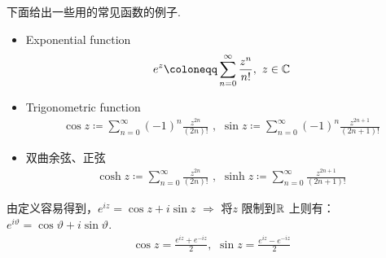 	\newpage
	\begin{example}\label{ex 3.1.1}
		下面给出一些用的常见函数的例子.
		\begin{itemize}
			\item Exponential function
			\begin{align}
				e^z \coloneqq \sum_{n = 0}^{\infty}{\frac{z^n}{n!}} , \,\, z \in \C
			\end{align}
		
			\item Trigonometric function
			\begin{align}
				\cos{z} \coloneqq \sum_{n = 0}^{\infty}{(-1)^{n} \frac{z^{2n}}{(2n)!}} \,\, , \,\, \sin{z} \coloneqq \sum_{n = 0}^{\infty}{(-1)^{n} \frac{z^{2n + 1}}{(2n + 1)!}}
			\end{align}
		
			\item 双曲余弦、正弦
			\begin{align}
				\cosh{z} \coloneqq \sum_{n = 0}^{\infty}{\frac{z^{2n}}{(2n)!}} \,\, , \,\, \sinh{z} \coloneqq \sum_{n = 0}^{\infty}{\frac{z^{2n + 1}}{(2n + 1)!}}
			\end{align}
		\end{itemize}
		
		\begin{rmk}
			由定义容易得到，$e^{iz} = \cos{z} + i\sin{z}$ $\Rightarrow$ 将$z$ 限制到$\mathbb{R}$ 上则有：$e^{i\vartheta} = \cos{\vartheta} + i\sin{\vartheta}$.
			\begin{align}
				\cos{z} = \frac{e^{iz} + e^{-iz}}{2} , \,\, \sin{z} = \frac{e^{iz} - e^{-iz}}{2}
			\end{align}
		\end{rmk}
	\end{example}

